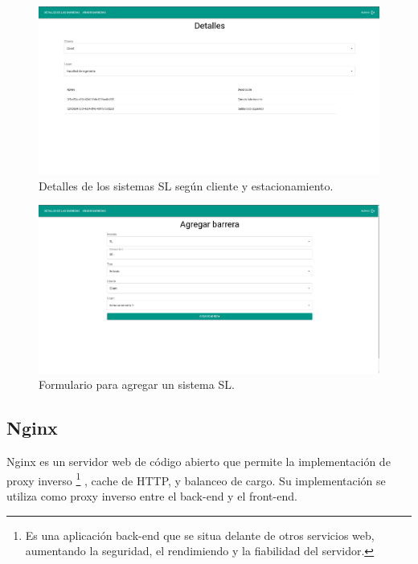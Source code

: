 \begin{figure}[bth]
    \centering
    \includegraphics[width=\textwidth]{imgs/server/admin-details.png}
    \caption{Detalles de los sistemas SL según cliente y estacionamiento.}
    \label{fig:admin-details}
\end{figure}

\begin{figure}[bth]
    \centering
    \includegraphics[width=\textwidth]{imgs/server/add-barrier.png}
    \caption{Formulario para agregar un sistema SL.}
    \label{fig:add-barrier}
\end{figure}

\subsection{Nginx}

Nginx es un servidor web de código abierto que permite la implementación de
proxy inverso \footnote{Es una aplicación back-end que se situa delante de otros servicios web, aumentando la seguridad, el rendimiendo y la fiabilidad del servidor.}
, cache de HTTP, y balanceo de cargo.
Su implementación se utiliza como proxy inverso entre el back-end y el front-end.



